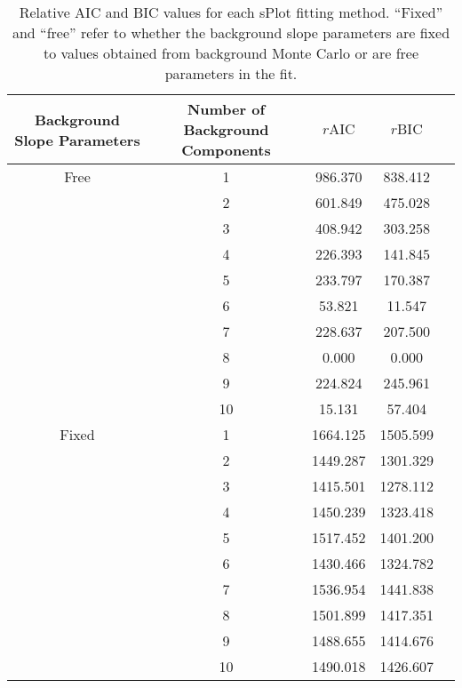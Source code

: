 \begin{table}[ht]
    \begin{center}
        \begin{tabular}{ccccc}\toprule
        Background Slope Parameters & Number of Background Components & $r\text{AIC}$ & $r\text{BIC}$\\\midrule
        Free & 1 & 986.370 & 838.412 \\
         & 2 & 601.849 & 475.028 \\
         & 3 & 408.942 & 303.258 \\
         & 4 & 226.393 & 141.845 \\
         & 5 & 233.797 & 170.387 \\
         & 6 & 53.821 & 11.547 \\
         & 7 & 228.637 & 207.500 \\
         & 8 & 0.000 & 0.000 \\
         & 9 & 224.824 & 245.961 \\
         & 10 & 15.131 & 57.404 \\
        Fixed & 1 & 1664.125 & 1505.599 \\
         & 2 & 1449.287 & 1301.329 \\
         & 3 & 1415.501 & 1278.112 \\
         & 4 & 1450.239 & 1323.418 \\
         & 5 & 1517.452 & 1401.200 \\
         & 6 & 1430.466 & 1324.782 \\
         & 7 & 1536.954 & 1441.838 \\
         & 8 & 1501.899 & 1417.351 \\
         & 9 & 1488.655 & 1414.676 \\
         & 10 & 1490.018 & 1426.607 \\\bottomrule
        \end{tabular}
        \caption{Relative AIC and BIC values for each sPlot fitting method. ``Fixed'' and ``free'' refer to whether the background slope parameters are fixed to values obtained from background Monte Carlo or are free parameters in the fit.}\label{tab:splot-model-results}
    \end{center}
\end{table}